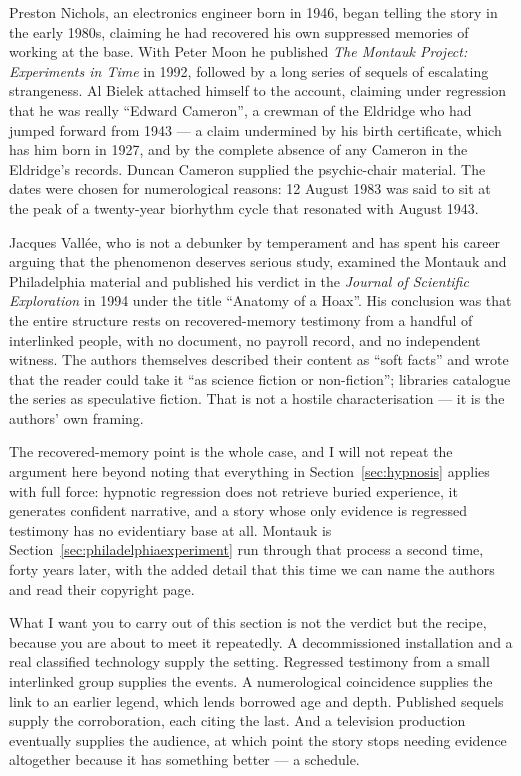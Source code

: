  Preston Nichols, an electronics engineer
born in 1946, began telling the story in the early 1980s, claiming he had recovered his own
suppressed memories of working at the base. With Peter Moon he published \emph{The Montauk
Project: Experiments in Time} in 1992, followed by a long series of sequels of escalating
strangeness. Al Bielek attached himself to the account, claiming under regression that he was
really ``Edward Cameron'', a crewman of the Eldridge who had jumped forward from 1943 --- a
claim undermined by his birth certificate, which has him born in 1927, and by the complete
absence of any Cameron in the Eldridge's records. Duncan Cameron supplied the psychic-chair
material. The dates were chosen for numerological reasons: 12 August 1983 was said to sit at
the peak of a twenty-year biorhythm cycle that resonated with August 1943.

Jacques Vallée, who is not a debunker by temperament and has spent his career arguing that the
phenomenon deserves serious study, examined the Montauk and Philadelphia material and published
his verdict in the \emph{Journal of Scientific Exploration} in 1994 under the title ``Anatomy of
a Hoax''. His conclusion was that the entire structure rests on recovered-memory testimony from
a handful of interlinked people, with no document, no payroll record, and no independent
witness. The authors themselves described their content as ``soft facts'' and wrote that the
reader could take it ``as science fiction or non-fiction''; libraries catalogue the series as
speculative fiction. That is not a hostile characterisation --- it is the authors' own framing.

The recovered-memory point is the whole case, and I will not repeat the argument here beyond
noting that everything in Section~\ref{sec:hypnosis} applies with full force: hypnotic
regression does not retrieve buried experience, it generates confident narrative, and a story
whose only evidence is regressed testimony has no evidentiary base at all. Montauk is
Section~\ref{sec:philadelphiaexperiment} run through that process a second time, forty years
later, with the added detail that this time we can name the authors and read their copyright
page.

What I want you to carry out of this section is not the verdict but the recipe, because you are
about to meet it repeatedly. A decommissioned installation and a real classified technology
supply the setting. Regressed testimony from a small interlinked group supplies the events.
A numerological coincidence supplies the link to an earlier legend, which lends borrowed
age and depth. Published sequels supply the corroboration, each citing the last. And a
television production eventually supplies the audience, at which point the story stops needing
evidence altogether because it has something better --- a schedule.

